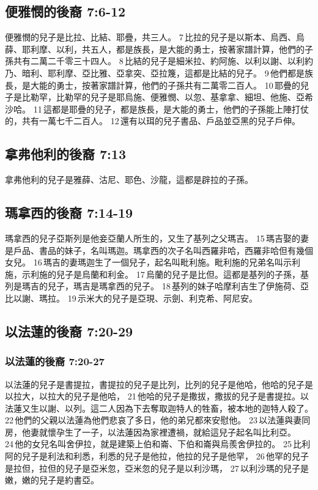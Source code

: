 \subsection{便雅憫的後裔 7:6-12 }
便雅憫的兒子是比拉、比結、耶疊，共三人。 7 比拉的兒子是以斯本、烏西、烏薛、耶利摩、以利，共五人，都是族長，是大能的勇士，按著家譜計算，他們的子孫共有二萬二千零三十四人。 8 比結的兒子是細米拉、約阿施、以利以謝、以利約乃、暗利、耶利摩、亞比雅、亞拿突、亞拉篾，這都是比結的兒子。 9 他們都是族長，是大能的勇士，按著家譜計算，他們的子孫共有二萬零二百人。 10 耶疊的兒子是比勒罕，比勒罕的兒子是耶烏施、便雅憫、以忽、基拿拿、細坦、他施、亞希沙哈。 11 這都是耶疊的兒子，都是族長，是大能的勇士，他們的子孫能上陣打仗的，共有一萬七千二百人。 12 還有以珥的兒子書品、戶品並亞黑的兒子戶伸。

\subsection{拿弗他利的後裔 7:13 }
拿弗他利的兒子是雅薛、沽尼、耶色、沙龍，這都是辟拉的子孫。

\subsection{瑪拿西的後裔 7:14-19 }
瑪拿西的兒子亞斯列是他妾亞蘭人所生的，又生了基列之父瑪吉。 15 瑪吉娶的妻是戶品、書品的妹子，名叫瑪迦。瑪拿西的次子名叫西羅非哈，西羅非哈但有幾個女兒。 16 瑪吉的妻瑪迦生了一個兒子，起名叫毗利施。毗利施的兄弟名叫示利施，示利施的兒子是烏蘭和利金。 17 烏蘭的兒子是比但。這都是基列的子孫，基列是瑪吉的兒子，瑪吉是瑪拿西的兒子。 18 基列的妹子哈摩利吉生了伊施荷、亞比以謝、瑪拉。 19 示米大的兒子是亞現、示劍、利克希、阿尼安。

\subsection{以法蓮的後裔 7:20-29 }
\subsubsection{以法蓮的後裔 7:20-27}
以法蓮的兒子是書提拉，書提拉的兒子是比列，比列的兒子是他哈，他哈的兒子是以拉大，以拉大的兒子是他哈， 21 他哈的兒子是撒拔，撒拔的兒子是書提拉。以法蓮又生以謝、以列。這二人因為下去奪取迦特人的牲畜，被本地的迦特人殺了。 22 他們的父親以法蓮為他們悲哀了多日，他的弟兄都來安慰他。 23 以法蓮與妻同房，他妻就懷孕生了一子，以法蓮因為家裡遭禍，就給這兒子起名叫比利亞。 24 他的女兒名叫舍伊拉，就是建築上伯和崙、下伯和崙與烏羨舍伊拉的。 25 比利阿的兒子是利法和利悉，利悉的兒子是他拉，他拉的兒子是他罕， 26 他罕的兒子是拉但，拉但的兒子是亞米忽，亞米忽的兒子是以利沙瑪， 27 以利沙瑪的兒子是嫩，嫩的兒子是約書亞。

